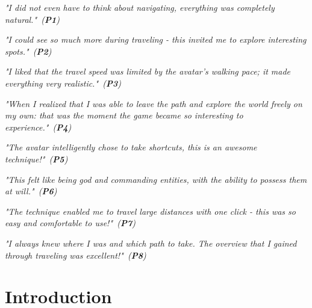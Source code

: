 \documentclass[sigchi-a, authorversion]{acmart}
\begin{document}
\begin{sidebar}
\textit{"I did not even have to think about navigating, everything was completely natural."~(\textbf{P1})}

\vspace{2.5em}
\begin{flushright}\textit{"I could see so much more during traveling - this invited me to explore interesting spots."~(\textbf{P2})}\end{flushright}

\vspace{2.5em}
\textit{"I liked that the travel speed was limited by the avatar's walking pace; it made everything very realistic."~(\textbf{P3})}

\vspace{2.5em}
\begin{flushright}\textit{"When I realized that I was able to leave the path and explore the world freely on my own: that was the moment the game became so interesting to experience."~(\textbf{P4})}\end{flushright}

\vspace{2.5em}
\textit{"The avatar intelligently chose to take shortcuts, this is an awesome technique!"~(\textbf{P5})}

\vspace{2.5em}
\begin{flushright}\textit{"This felt like being god and commanding entities, with the ability to possess them at will."~(\textbf{P6})}\end{flushright}

\vspace{2.5em}
\textit{"The technique enabled me to travel large distances with one click - this was so easy and comfortable to use!"~(\textbf{P7})}

\vspace{2.5em}
\begin{flushright}\textit{"I always knew where I was and which path to take. The overview that I gained through traveling was excellent!"~(\textbf{P8})}\end{flushright}
\end{sidebar}

\section{Introduction}
\end{document}
